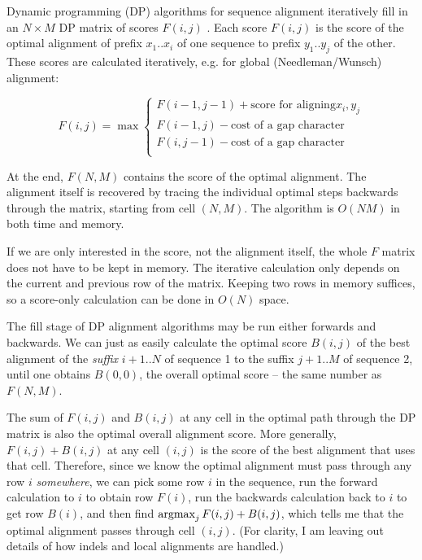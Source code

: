 \documentclass[11pt]{article}
\def\argmax{\mathop{\mathrm{argmax}}\limits}
\begin{document}
Dynamic programming (DP) algorithms for sequence alignment iteratively
fill in an $N \times M$ DP matrix of scores $F(i,j)$
\cite{Needleman70,Smith81}. Each score $F(i,j)$ is the score of the
optimal alignment of prefix $x_1..x_i$ of one sequence to prefix
$y_1..y_j$ of the other. These scores are calculated iteratively, e.g.
for global (Needleman/Wunsch) alignment:

\[  F(i,j) = \max \left\{ \begin{array}{l}
                       F(i-1,j-1) + \mbox{score for aligning} x_i, y_j \\
                       F(i-1,j) - \mbox{cost of a gap character} \\
                       F(i,j-1) - \mbox{cost of a gap character} \\
                       \end{array} \right. \]

At the end, $F(N,M)$ contains the score of the optimal alignment. The
alignment itself is recovered by tracing the individual optimal steps
backwards through the matrix, starting from cell $(N,M)$. The
algorithm is $O(NM)$ in both time and memory.

If we are only interested in the score, not the alignment itself, the
whole $F$ matrix does not have to be kept in memory. The iterative
calculation only depends on the current and previous row of the
matrix. Keeping two rows in memory suffices, so a score-only
calculation can be done in $O(N)$ space.

The fill stage of DP alignment algorithms may be run either forwards
and backwards. We can just as easily calculate the optimal score
$B(i,j)$ of the best alignment of the \emph{suffix} $i+1..N$ of
sequence 1 to the suffix $j+1..M$ of sequence 2, until one obtains
$B(0,0)$, the overall optimal score -- the same number as $F(N,M)$.

The sum of $F(i,j)$ and $B(i,j)$ at any cell in the optimal path
through the DP matrix is also the optimal overall alignment score.
More generally, $F(i,j) + B(i,j)$ at any cell $(i,j)$ is the score of
the best alignment that uses that cell. Therefore, since we know the
optimal alignment must pass through any row $i$ \emph{somewhere}, we
can pick some row $i$ in the sequence, run the forward calculation to
$i$ to obtain row $F(i)$, run the backwards calculation back to $i$ to
get row $B(i)$, and then find $\argmax\nolimits_j F(i,j) + B(i,j)$, which tells
me that the optimal alignment passes through cell $(i,j)$. (For
clarity, I am leaving out details of how indels and local alignments
are handled.)
\end{document}
